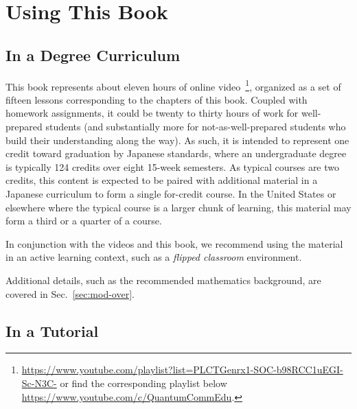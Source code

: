 \chapter*{Using This Book}

\section*{In a Degree Curriculum}

This book represents about eleven hours of online video~\footnote{\url{https://www.youtube.com/playlist?list=PLCTGenrx1-SOC-b98RCC1uEGI-Sc-N3C-} or find the corresponding playlist below \url{https://www.youtube.com/c/QuantumCommEdu}.}, organized as a set of fifteen lessons corresponding to the chapters of this book. Coupled with homework assignments, it could be twenty to thirty hours of work for well-prepared students (and substantially more for not-as-well-prepared students who build their understanding along the way).  As such, it is intended to represent one credit toward graduation by Japanese standards, where an undergraduate degree is typically 124 credits over eight 15-week semesters. As typical courses are two credits, this content is expected to be paired with additional material in a Japanese curriculum to form a single for-credit course. In the United States or elsewhere where the typical course is a larger chunk of learning, this material may form a third or a quarter of a course.

In conjunction with the videos and this book, we recommend using the material in an active learning context, such as a \emph{flipped classroom} environment.

Additional details, such as the recommended mathematics background, are covered in Sec.~\ref{sec:mod-over}.

\section*{In a Tutorial}

